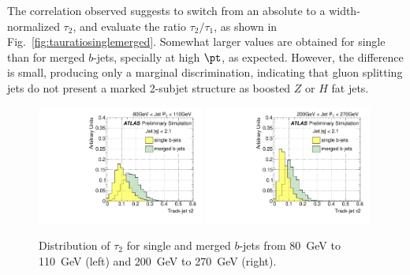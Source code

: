 The correlation observed suggests to switch from an absolute to a width-normalized $\tau_2$, and evaluate the ratio $\tau_2/\tau_1$, as shown in  Fig.~\ref{fig:tauratiosinglemerged}. %
Somewhat larger values are obtained for single than for merged $b$-jets, specially at high $\pt$, %
as expected. However, the difference is small, producing only a marginal discrimination, indicating that gluon splitting jets do not present a marked 2-subjet structure as boosted $Z$ or $H$ fat jets.

\begin{figure}[tp]
\centering
\includegraphics[width=0.49\textwidth]{FIGS/VarsSingleMerged/Tau2080.pdf}
\includegraphics[width=0.49\textwidth]{FIGS/VarsSingleMerged/Tau2200.pdf}
\caption{Distribution of $\tau_2$ for single and merged $b$-jets from 80~GeV to 110~GeV (left) and 200~GeV to 270~GeV (right).}
\label{fig:tau2singlemerged}
\end{figure}

